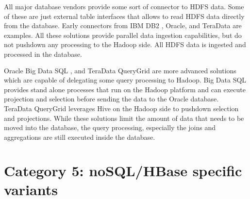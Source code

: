 \documentclass{vldb}
\begin{document}
All major database vendors provide some sort of connector to HDFS data. Some of these are just external table interfaces that allows to read HDFS data directly from the database. Early connectors from IBM DB2 \cite{ibm-sigmod2011}, Oracle, and TeraData are examples.
All these solutions provide parallel data ingestion capabilities, but do not pushdown any processing to the Hadoop side. All HDFS data is ingested and processed in the database.

Oracle Big Data SQL \cite{bigdataSQL}, and TeraData QueryGrid \cite{queryGrid} are more advanced solutions which are capable of delegating some query processing to Hadoop. Big Data SQL provides stand alone processes that run on the Hadoop platform and can execute projection and selection before sending the data to the Oracle database. TeraData QueryGrid leverages Hive on the Hadoop side to pushdown selection and projections. While these solutions limit the amount of data that needs to be moved into the database, the query processing, especially the joins and aggregations are still executed inside the database. 


\section{Category 5: noSQL/HBase specific variants}






\balance
\end{document}

